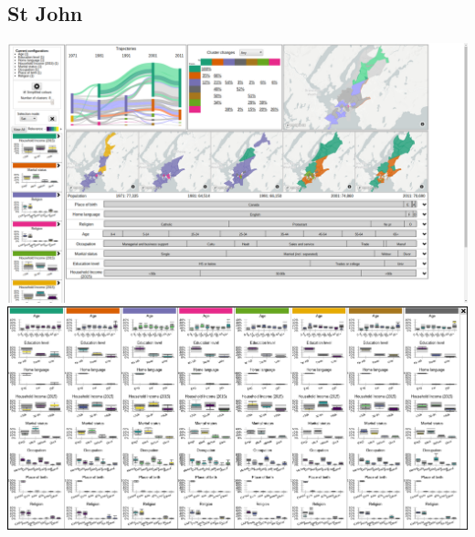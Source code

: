 \documentclass[a4paper]{article}
\begin{document}
\subsection{St John}
\begin{center}
	\includegraphics[width=\linewidth]{8a.png}
	\includegraphics[width=\linewidth]{8b.png}
\end{center}
\end{document}

